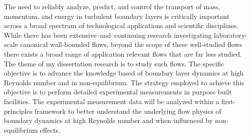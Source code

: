 \begin{Abstractpage}

\setlength{\baselineskip}{1.5\baselineskip}  {
The need to reliably analyze, predict, and control the transport of mass, momentum, and energy in turbulent boundary layers is critically important across a broad spectrum of technological applications and scientific disciplines.
While there has been extensive--and--continuing research investigating laboratory-scale canonical wall-bounded flows, beyond the scope of these well-studied flows there exists a broad range of application relevant flows that are far less studied.
The theme of my dissertation research is to study such flows. 
The specific objective is to advance the knowledge based of boundary layer dynamics at high Reynolds number and in non-equilibrium. 
The strategy employed to achieve this objective is to perform detailed experimental measurements in purpose built facilities. 
The experimental measurement data will be analyzed within a first-principles framework to better understand the underlying flow physics of boundary dynamics at high Reynolds number and when influenced by non-equilibrium effects. 
}


\end{Abstractpage}
